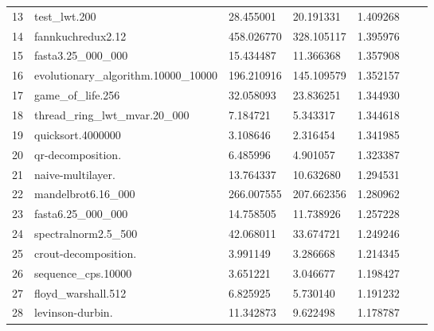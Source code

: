 \documentclass[12pt,a4paper, headings=standardclasses, parskip=on]{scrartcl}
\begin{document}
\begin{longtable}{@{}lllllll@{}}
13 & test\_lwt.200                                      & 28.455001            & 20.191331    & 1.409268                      \\
14 & fannkuchredux2.12                                  & 458.026770           & 328.105117   & 1.395976                      \\
15 & fasta3.25\_000\_000                                & 15.434487            & 11.366368    & 1.357908                      \\
16 & evolutionary\_algorithm.10000\_10000               & 196.210916           & 145.109579   & 1.352157                      \\
17 & game\_of\_life.256                                 & 32.058093            & 23.836251    & 1.344930                      \\
18 & thread\_ring\_lwt\_mvar.20\_000                    & 7.184721             & 5.343317     & 1.344618                      \\
19 & quicksort.4000000                                  & 3.108646             & 2.316454     & 1.341985                      \\
20 & qr-decomposition.                                  & 6.485996             & 4.901057     & 1.323387                      \\
21 & naive-multilayer.                                  & 13.764337            & 10.632680    & 1.294531                      \\
22 & mandelbrot6.16\_000                                & 266.007555           & 207.662356   & 1.280962                      \\
23 & fasta6.25\_000\_000                                & 14.758505            & 11.738926    & 1.257228                      \\
24 & spectralnorm2.5\_500                               & 42.068011            & 33.674721    & 1.249246                      \\
25 & crout-decomposition.                               & 3.991149             & 3.286668     & 1.214345                      \\
26 & sequence\_cps.10000                                & 3.651221             & 3.046677     & 1.198427                      \\
27 & floyd\_warshall.512                                & 6.825925             & 5.730140     & 1.191232                      \\
28 & levinson-durbin.                                   & 11.342873            & 9.622498     & 1.178787                      \\

\end{longtable}
\end{document}
